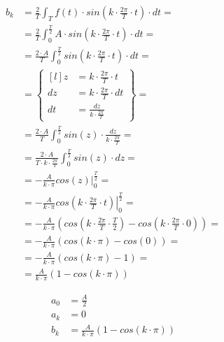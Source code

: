 \begin{task}
\begin{align*}
b_k&=\frac{2}{T}\int_{T}f(t) \cdot sin\left( k \cdot \frac{2\pi}{T} \cdot t\right) \cdot dt=\\
&=\frac{2}{T}\int_{0}^{\frac{T}{2}}A \cdot sin\left( k \cdot \frac{2\pi}{T} \cdot t\right) \cdot dt=\\
&=\frac{2\cdot A}{T}\int_{0}^{\frac{T}{2}} sin\left( k \cdot \frac{2\pi}{T} \cdot t\right) \cdot dt=\\
&=\begin{Bmatrix*}[l]
z&=k\cdot \frac{2\pi}{T} \cdot t\\
dz&=k\cdot \frac{2\pi}{T} \cdot dt\\
dt&=\frac{dz}{k\cdot \frac{2\pi}{T}}
\end{Bmatrix*}=\\
&=\frac{2\cdot A}{T}\int_{0}^{\frac{T}{2}} sin\left( z\right) \cdot \frac{dz}{k\cdot \frac{2\pi}{T}}=\\
&=\frac{2\cdot A}{T \cdot k\cdot \frac{2\pi}{T}}\int_{0}^{\frac{T}{2}} sin\left( z\right) \cdot dz=\\
&=-\frac{A}{k\cdot \pi}\left. cos\left( z\right) \right|_{0}^{\frac{T}{2}}=\\
&=-\frac{A}{k\cdot \pi}\left. cos\left( k\cdot \frac{2\pi}{T} \cdot t\right) \right|_{0}^{\frac{T}{2}}=\\
&=-\frac{A}{k\cdot \pi}\left( cos\left( k\cdot \frac{2\pi}{T} \cdot \frac{T}{2}\right) - cos\left( k\cdot \frac{2\pi}{T} \cdot 0\right)\right)=\\
&=-\frac{A}{k\cdot \pi}\left( cos\left( k\cdot \pi \right) - cos\left( 0\right)\right)=\\
&=-\frac{A}{k\cdot \pi}\left( cos\left( k\cdot \pi \right) - 1\right)=\\
&=\frac{A}{k\cdot \pi}\left(1 - cos\left( k\cdot \pi \right)\right)
\end{align*}




\begin{equation}
\begin{aligned}
a_0&=\frac{A}{2}\\
a_k&=0\\
b_k&=\frac{A}{k\cdot \pi}\left(1 - cos\left( k\cdot \pi \right)\right)\\
\end{aligned}
\end{equation}


\end{task}
